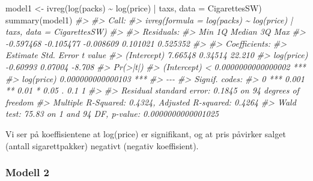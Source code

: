 \documentclass[
]{article}
\newenvironment{Shaded}{\begin{snugshade}}{\end{snugshade}}
\newcommand{\AttributeTok}[1]{\textcolor[rgb]{0.77,0.63,0.00}{#1}}
\newcommand{\CommentTok}[1]{\textcolor[rgb]{0.56,0.35,0.01}{\textit{#1}}}
\newcommand{\FunctionTok}[1]{\textcolor[rgb]{0.00,0.00,0.00}{#1}}
\newcommand{\NormalTok}[1]{#1}
\newcommand{\OtherTok}[1]{\textcolor[rgb]{0.56,0.35,0.01}{#1}}
\newcommand{\SpecialCharTok}[1]{\textcolor[rgb]{0.00,0.00,0.00}{#1}}
\begin{document}
\begin{Shaded}
\begin{Highlighting}[]
\NormalTok{model1 }\OtherTok{\textless{}{-}} \FunctionTok{ivreg}\NormalTok{(}\FunctionTok{log}\NormalTok{(packs) }\SpecialCharTok{\textasciitilde{}} \FunctionTok{log}\NormalTok{(price) }\SpecialCharTok{|}\NormalTok{ taxs, }\AttributeTok{data =}\NormalTok{ CigarettesSW)}
\FunctionTok{summary}\NormalTok{(model1)}
\CommentTok{\#\textgreater{} }
\CommentTok{\#\textgreater{} Call:}
\CommentTok{\#\textgreater{} ivreg(formula = log(packs) \textasciitilde{} log(price) | taxs, data = CigarettesSW)}
\CommentTok{\#\textgreater{} }
\CommentTok{\#\textgreater{} Residuals:}
\CommentTok{\#\textgreater{}       Min        1Q    Median        3Q       Max }
\CommentTok{\#\textgreater{} {-}0.597468 {-}0.105477 {-}0.008609  0.101021  0.525352 }
\CommentTok{\#\textgreater{} }
\CommentTok{\#\textgreater{} Coefficients:}
\CommentTok{\#\textgreater{}             Estimate Std. Error t value}
\CommentTok{\#\textgreater{} (Intercept)  7.66548    0.34514  22.210}
\CommentTok{\#\textgreater{} log(price)  {-}0.60993    0.07004  {-}8.708}
\CommentTok{\#\textgreater{}                         Pr(\textgreater{}|t|)    }
\CommentTok{\#\textgreater{} (Intercept) \textless{} 0.0000000000000002 ***}
\CommentTok{\#\textgreater{} log(price)     0.000000000000103 ***}
\CommentTok{\#\textgreater{} {-}{-}{-}}
\CommentTok{\#\textgreater{} Signif. codes:  }
\CommentTok{\#\textgreater{} 0 \textquotesingle{}***\textquotesingle{} 0.001 \textquotesingle{}**\textquotesingle{} 0.01 \textquotesingle{}*\textquotesingle{} 0.05 \textquotesingle{}.\textquotesingle{} 0.1 \textquotesingle{} \textquotesingle{} 1}
\CommentTok{\#\textgreater{} }
\CommentTok{\#\textgreater{} Residual standard error: 0.1845 on 94 degrees of freedom}
\CommentTok{\#\textgreater{} Multiple R{-}Squared: 0.4324,  Adjusted R{-}squared: 0.4264 }
\CommentTok{\#\textgreater{} Wald test: 75.83 on 1 and 94 DF,  p{-}value: 0.0000000000001025}
\end{Highlighting}
\end{Shaded}

Vi ser på koeffisientene at log(price) er signifikant, og at pris påvirker salget (antall sigarettpakker) negativt (negativ koeffisient).

\hypertarget{modell-2}{%
\subsubsection{Modell 2}\label{modell-2}}
\end{document}
